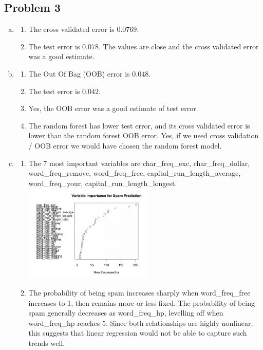 \documentclass[12pt]{article}
\begin{document}
\subsection*{Problem 3}
\begin{enumerate}[(a)]
\item 
\begin{enumerate}[1.]
\item The cross validated error is $0.0769$.
\item The test error is $0.078$. The values are close and the cross validated error was a good estimate.
\end{enumerate}
\item
\begin{enumerate}[1.]
\item The Out Of Bag (OOB) error is $0.048$. 
\item The test error is $0.042$. 
\item Yes, the OOB error was a good estimate of test error.
\item The random forest has lower test error, and its cross validated error is lower than the random forest OOB error. Yes, if we used cross validation / OOB error we would have chosen the random forest model.
\end{enumerate}
\item
\begin{enumerate}[1.]
\item The 7 most important variables are char\_freq\_exc, char\_freq\_dollar, word\_freq\_remove, word\_freq\_free, capital\_run\_length\_average, word\_freq\_your, capital\_run\_length\_longest.\\
\includegraphics[width=0.5\textwidth]{varImp.png}
\item The probability of being spam increases sharply when word\_freq\_free increases to 1, then remains more or less fixed. The probability of being spam generally decreases as word\_freq\_hp, levelling off when word\_freq\_hp reaches 5. Since both relationships are highly nonlinear, this suggests that linear regression would not be able to capture such trends well.\\

\end{enumerate}
\end{enumerate}
\end{document}
